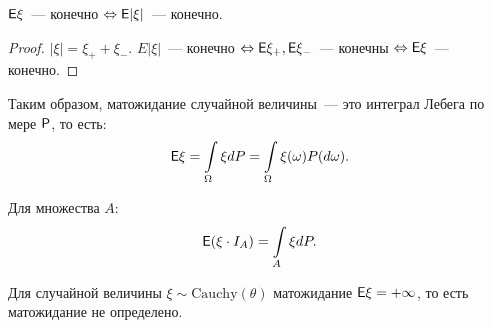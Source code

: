 \begin{consequence}
	$\E \xi$~--- конечно $\Leftrightarrow \E|\xi|$~--- конечно.
	\begin{proof}
		$|\xi| = \xi_+ + \xi_-$. $E|\xi|$~--- конечно $\Leftrightarrow \E\xi_+, \E\xi_-$~--- конечны $\Leftrightarrow \E\xi$~--- конечно.
	\end{proof}
\end{consequence}

\begin{statement}
    Таким образом, матожидание случайной величины~--- это интеграл Лебега по мере $\P$, то есть: $$ \E\xi = \int\limits_\Omega \xi dP = \int\limits_\Omega \xi(\omega)P(d\omega).$$

    Для множества $A$:
    $$ \E(\xi\cdot I_A) = \int\limits_A \xi dP. $$
\end{statement}

    Для случайной величины $\xi \sim \text{Cauchy}(\theta)$ матожидание $\E\xi = +\infty$, то есть матожидание не определено.

